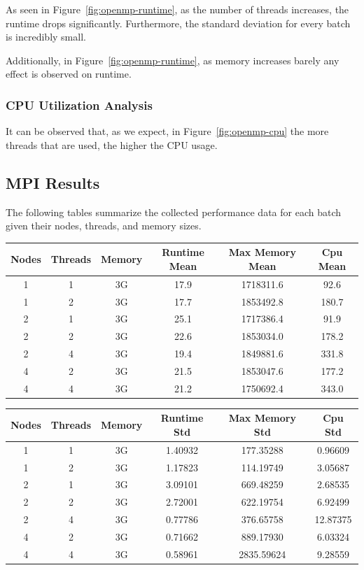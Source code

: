 \documentclass{article}
\begin{document}
As seen in Figure~\ref{fig:openmp-runtime}, as the number of threads increases, the runtime drops significantly. Furthermore, the standard deviation for every batch is incredibly small.

Additionally, in Figure~\ref{fig:openmp-runtime}, as memory increases barely any effect is observed on runtime.

\subsubsection{CPU Utilization Analysis}

It can be observed that, as we expect, in Figure~\ref{fig:openmp-cpu} the more threads that are used, the higher the CPU usage. 

\subsection*{MPI Results}

The following tables summarize the collected performance data for each batch given their nodes, threads, and memory sizes.

\begin{center}
\begin{tabular}{|c|c|c|c|c|c|}
\hline
Nodes & Threads & Memory & Runtime Mean & Max Memory Mean & Cpu Mean \\
\hline
1 & 1 & 3G & 17.9 & 1718311.6 & 92.6 \\
1 & 2 & 3G & 17.7 & 1853492.8 & 180.7 \\
\hline
2 & 1 & 3G & 25.1 & 1717386.4 & 91.9 \\
2 & 2 & 3G & 22.6 & 1853034.0 & 178.2 \\
2 & 4 & 3G & 19.4 & 1849881.6 & 331.8 \\
\hline
4 & 2 & 3G & 21.5 & 1853047.6 & 177.2 \\
4 & 4 & 3G & 21.2 & 1750692.4 & 343.0 \\
\hline
\end{tabular}
\end{center}

\begin{center}
\begin{tabular}{|c|c|c|c|c|c|}
\hline
Nodes & Threads & Memory & Runtime Std & Max Memory Std & Cpu Std \\
\hline
1 & 1 & 3G & 1.40932 & 177.35288 & 0.96609 \\
1 & 2 & 3G & 1.17823 & 114.19749 & 3.05687 \\
\hline
2 & 1 & 3G & 3.09101 & 669.48259 & 2.68535 \\
2 & 2 & 3G & 2.72001 & 622.19754 & 6.92499 \\
2 & 4 & 3G & 0.77786 & 376.65758 & 12.87375 \\
\hline
4 & 2 & 3G & 0.71662 & 889.17930 & 6.03324 \\
4 & 4 & 3G & 0.58961 & 2835.59624 & 9.28559 \\
\hline
\end{tabular}
\end{center}
\end{document}
